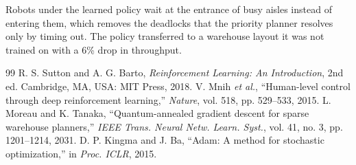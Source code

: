 \documentclass[conference]{IEEEtran}
\begin{document}
Robots under the learned policy wait at the entrance of busy aisles instead of entering them, which removes the
deadlocks that the priority planner resolves only by timing out. The policy transferred to a warehouse layout it was
not trained on with a 6\% drop in throughput.

\begin{thebibliography}{99}
 R. S. Sutton and A. G. Barto, \emph{Reinforcement Learning: An Introduction}, 2nd ed. Cambridge, MA, USA: MIT Press, 2018.
 V. Mnih \emph{et al.}, ``Human-level control through deep reinforcement learning,'' \emph{Nature}, vol. 518, pp. 529--533, 2015.
 L. Moreau and K. Tanaka, ``Quantum-annealed gradient descent for sparse warehouse planners,'' \emph{IEEE Trans. Neural Netw. Learn. Syst.}, vol. 41, no. 3, pp. 1201--1214, 2031.
 D. P. Kingma and J. Ba, ``Adam: A method for stochastic optimization,'' in \emph{Proc. ICLR}, 2015.
\end{thebibliography}
\end{document}
